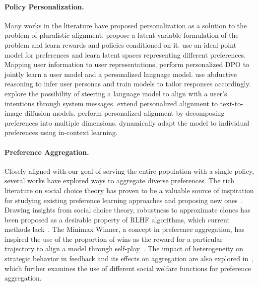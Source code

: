 \paragraph{Policy Personalization.} 
Many works in the literature have proposed personalization as a solution to the problem of pluralistic alignment. \citet{poddar_personalizing_2024} propose a latent variable formulation of the problem and learn rewards and policies conditioned on it. \citet{chen_pal_2024} use an ideal point model for preferences and learn latent spaces representing different preferences. Mapping user information to user representations, \citet{li_personalized_2024} perform personalized DPO to jointly learn a user model and a personalized language model. \citet{balepur2025boatdoesfloatimproving} use abductive reasoning to infer user personas and train models to tailor responses accordingly. \citet{lee_aligning_2024} explore the possibility of steering a language model to align with a user's intentions through system messages. \citet{dang_personalized_2025} extend personalized alignment to text-to-image diffusion models. \citet{jang_personalized_2023} perform personalized alignment by decomposing preferences into multiple dimensions. \citet{lau_personalized_2024} dynamically adapt the model to individual preferences using in-context learning.


\paragraph{Preference Aggregation.} 
Closely aligned with our goal of serving the entire population with a single policy, several works have explored ways to aggregate diverse preferences. The rich literature on social choice theory has proven to be a valuable source of inspiration for studying existing preference learning approaches and proposing new ones~\citep{conitzer2024social, qiu_representative_2024,alamdari_policy_2024,ge2024axioms,dai2024mapping}. Drawing insights from social choice theory, robustness to approximate clones has been proposed as a desirable property of RLHF algorithms, which current methods lack~\citep{procaccia2025clone}. The Minimax Winner, a concept in preference aggregation, has inspired the use of the proportion of wins as the reward for a particular trajectory to align a model through self-play~\citep{swamy_minimaximalist_2024}. The impact of heterogeneity on strategic behavior in feedback and its effects on aggregation are also explored in~\citet{park2024rlhf}, which further examines the use of different social welfare functions for preference aggregation.



